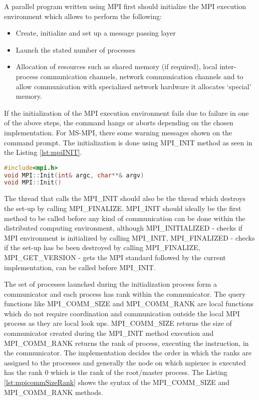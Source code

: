 A parallel program written using MPI first should initialize the MPI execution environment which allows to perform the following:
\begin{itemize}
\item Create, initialize and set up a message passing layer
\item Launch the stated number of processes
\item Allocation of resources such as shared memory (if required), local inter-process communication channels,
network communication channels and to allow communication with specialized network hardware it allocates {\lq}special{\rq} memory.  
\end{itemize}

If the initialization of the MPI execution environment fails due to failure in one of the above steps, the command hangs or aborts depending on the chosen implementation. For MS-MPI, there some warning messages shown on the command prompt. The initialization is done using MPI\_INIT method as seen in the Listing \ref{lst:mpiINIT}. 

\begin{lstlisting}[language=C++,label={lst:mpiINIT},caption={Initialization of Execution Environment}]
#include<mpi.h>
void MPI::Init(int& argc, char**& argv)
void MPI::Init()
\end{lstlisting}

The thread that calls the MPI\_INIT should also be the thread which destroys the set-up by calling MPI\_FINALIZE. MPI\_INIT should ideally be the first method to be called before any kind of communication can be done within the distributed computing environment, although MPI\_INITIALIZED - checks if MPI environment is initialized by calling MPI\_INIT, MPI\_FINALIZED - checks if the set-up has be been destroyed by calling MPI\_FINALIZE, MPI\_GET\_VERSION - gets the MPI standard followed by the current implementation, can be called before MPI\_INIT. \newline

The set of processes launched during the initialization process form a communicator and each process has rank within the communicator.
The query functions like MPI\_COMM\_SIZE and MPI\_COMM\_RANK are local functions which do not require coordination and communication outside the local MPI process as they are local look ups. MPI\_COMM\_SIZE returns the size of communicator created during the  MPI\_INIT method execution and MPI\_COMM\_RANK returns the rank of process, executing the instruction, in the communicator. The implementation decides the order in which the ranks are assigned to the processes and generally the node on which mpiexec is executed has the rank 0 which is the rank of the root/master process. The Listing \ref{lst:mpicommSizeRank} shows the syntax of the MPI\_COMM\_SIZE and MPI\_COMM\_RANK methods.


